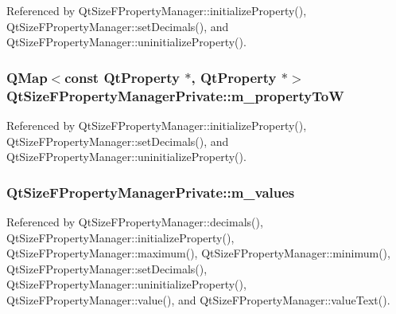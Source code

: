 Referenced by Qt\+Size\+F\+Property\+Manager\+::initialize\+Property(), Qt\+Size\+F\+Property\+Manager\+::set\+Decimals(), and Qt\+Size\+F\+Property\+Manager\+::uninitialize\+Property().

\subsubsection[{m\+\_\+property\+ToW}]{\setlength{\rightskip}{0pt plus 5cm}Q\+Map$<$const {\bf Qt\+Property} $\ast$, {\bf Qt\+Property} $\ast$$>$ Qt\+Size\+F\+Property\+Manager\+Private\+::m\+\_\+property\+ToW}\label{classQtSizeFPropertyManagerPrivate_abff74170fd5947fe9ab3cd7ebf1701d4}


Referenced by Qt\+Size\+F\+Property\+Manager\+::initialize\+Property(), Qt\+Size\+F\+Property\+Manager\+::set\+Decimals(), and Qt\+Size\+F\+Property\+Manager\+::uninitialize\+Property().

\subsubsection[{m\+\_\+values}]{ Qt\+Size\+F\+Property\+Manager\+Private\+::m\+\_\+values}\label{classQtSizeFPropertyManagerPrivate_acc20b9a482efa6a2b8b3138248b2b6e1}


Referenced by Qt\+Size\+F\+Property\+Manager\+::decimals(), Qt\+Size\+F\+Property\+Manager\+::initialize\+Property(), Qt\+Size\+F\+Property\+Manager\+::maximum(), Qt\+Size\+F\+Property\+Manager\+::minimum(), Qt\+Size\+F\+Property\+Manager\+::set\+Decimals(), Qt\+Size\+F\+Property\+Manager\+::uninitialize\+Property(), Qt\+Size\+F\+Property\+Manager\+::value(), and Qt\+Size\+F\+Property\+Manager\+::value\+Text().

